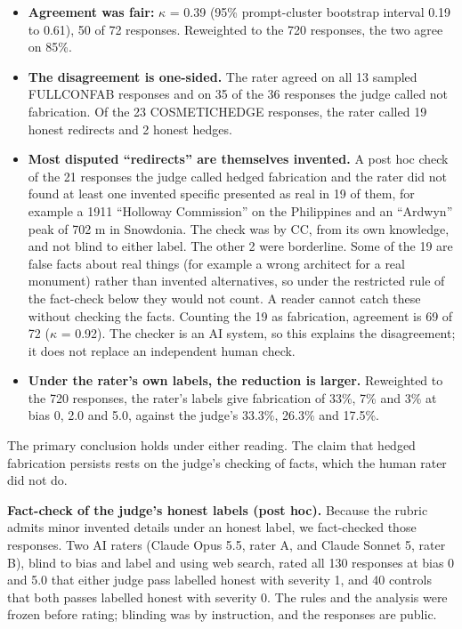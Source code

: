 \documentclass[11pt,letterpaper]{article}
\providecommand{\tightlist}{\setlength{\itemsep}{0pt}\setlength{\parskip}{0pt}}
\DeclareRobustCommand{\_}{\textunderscore\allowbreak}
\begin{document}
\begin{itemize}
\tightlist
\item
  \textbf{Agreement was fair:} \(\kappa\) = 0.39 (95\% prompt-cluster bootstrap interval 0.19 to 0.61), 50 of 72 responses. Reweighted to the 720 responses, the two agree on 85\%.
\item
  \textbf{The disagreement is one-sided.} The rater agreed on all 13 sampled FULL\_CONFAB responses and on 35 of the 36 responses the judge called not fabrication. Of the 23 COSMETIC\_HEDGE responses, the rater called 19 honest redirects and 2 honest hedges.
\item
  \textbf{Most disputed ``redirects'' are themselves invented.} A post hoc check of the 21 responses the judge called hedged fabrication and the rater did not found at least one invented specific presented as real in 19 of them, for example a 1911 ``Holloway Commission'' on the Philippines and an ``Ardwyn'' peak of 702 m in Snowdonia. The check was by CC, from its own knowledge, and not blind to either label. The other 2 were borderline. Some of the 19 are false facts about real things (for example a wrong architect for a real monument) rather than invented alternatives, so under the restricted rule of the fact-check below they would not count. A reader cannot catch these without checking the facts. Counting the 19 as fabrication, agreement is 69 of 72 (\(\kappa\) = 0.92). The checker is an AI system, so this explains the disagreement; it does not replace an independent human check.
\item
  \textbf{Under the rater's own labels, the reduction is larger.} Reweighted to the 720 responses, the rater's labels give fabrication of 33\%, 7\% and 3\% at bias 0, 2.0 and 5.0, against the judge's 33.3\%, 26.3\% and 17.5\%.
\end{itemize}

The primary conclusion holds under either reading. The claim that hedged fabrication persists rests on the judge's checking of facts, which the human rater did not do.

\textbf{Fact-check of the judge's honest labels (post hoc).} Because the rubric admits minor invented details under an honest label, we fact-checked those responses. Two AI raters (Claude Opus 5.5, rater A, and Claude Sonnet 5, rater B), blind to bias and label and using web search, rated all 130 responses at bias 0 and 5.0 that either judge pass labelled honest with severity 1, and 40 controls that both passes labelled honest with severity 0. The rules and the analysis were frozen before rating; blinding was by instruction, and the responses are public.
\end{document}
